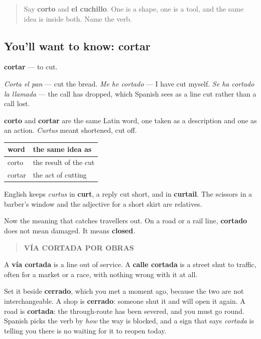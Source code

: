 \begin{quote}
Say \textbf{corto} and \textbf{el cuchillo}. One is a shape, one is a tool, and the same idea is inside both. Name the verb.
\end{quote}

\subsection*{You'll want to know: cortar}
\textbf{cortar} — to cut.

\emph{Corta el pan} — cut the bread. \emph{Me he cortado} — I have cut myself. \emph{Se ha cortado la llamada} — the call has dropped, which Spanish sees as a line cut rather than a call lost.

\begin{cousinweb}
\textbf{corto} and \textbf{cortar} are the same Latin word, one taken as a description and one as an action. \emph{Curtus} meant shortened, cut off.

\noindent
\begin{tabularx}{\linewidth}{@{}>{\raggedright\arraybackslash}X>{\raggedright\arraybackslash}X@{}}
\toprule
\textbf{word} & \textbf{the same idea as} \\
\midrule
corto & the result of the cut \\
cortar & the act of cutting \\
\bottomrule
\end{tabularx}

English keeps \emph{curtus} in \textbf{curt}, a reply cut short, and in \textbf{curtail}. The scissors in a barber's window and the adjective for a short skirt are relatives.
\end{cousinweb}

\begin{culture}
Now the meaning that catches travellers out. On a road or a rail line, \textbf{cortado} does not mean damaged. It means \textbf{closed}.

\begin{quote}
\textbf{VÍA CORTADA POR OBRAS}
\end{quote}

A \textbf{vía cortada} is a line out of service. A \textbf{calle cortada} is a street shut to traffic, often for a market or a race, with nothing wrong with it at all.

Set it beside \textbf{cerrado}, which you met a moment ago, because the two are not interchangeable. A shop is \textbf{cerrado}: someone shut it and will open it again. A road is \textbf{cortada}: the through-route has been severed, and you must go round. Spanish picks the verb by \emph{how} the way is blocked, and a sign that says \emph{cortada} is telling you there is no waiting for it to reopen today.
\end{culture}

